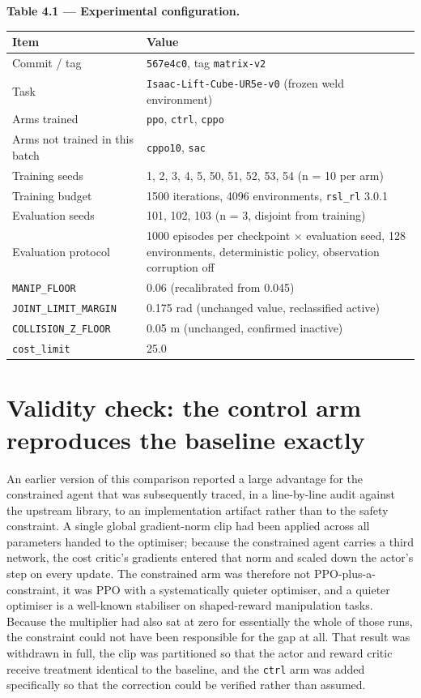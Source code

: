 \textbf{Table 4.1 --- Experimental configuration.}

\begin{longtable}[]{@{}ll@{}}
\toprule
Item & Value\tabularnewline
\midrule
\endhead
Commit / tag & \texttt{567e4c0}, tag \texttt{matrix-v2}\tabularnewline
Task & \texttt{Isaac-Lift-Cube-UR5e-v0} (frozen weld environment)\tabularnewline
Arms trained & \texttt{ppo}, \texttt{ctrl}, \texttt{cppo}\tabularnewline
Arms not trained in this batch & \texttt{cppo10}, \texttt{sac}\tabularnewline
Training seeds & 1, 2, 3, 4, 5, 50, 51, 52, 53, 54 (n = 10 per arm)\tabularnewline
Training budget & 1500 iterations, 4096 environments, \texttt{rsl\_rl} 3.0.1\tabularnewline
Evaluation seeds & 101, 102, 103 (n = 3, disjoint from training)\tabularnewline
Evaluation protocol & 1000 episodes per checkpoint \(\times\) evaluation seed, 128 environments, deterministic policy, observation corruption off\tabularnewline
\texttt{MANIP\_FLOOR} & 0.06 (recalibrated from 0.045)\tabularnewline
\texttt{JOINT\_LIMIT\_MARGIN} & 0.175 rad (unchanged value, reclassified active)\tabularnewline
\texttt{COLLISION\_Z\_FLOOR} & 0.05 m (unchanged, confirmed inactive)\tabularnewline
\texttt{cost\_limit} & 25.0\tabularnewline
\bottomrule
\end{longtable}


\section{Validity check: the control arm reproduces the baseline exactly}\label{sec:r-validity}

An earlier version of this comparison reported a large advantage for the constrained agent that
was subsequently traced, in a line-by-line audit against the upstream library, to an
implementation artifact rather than to the safety constraint. A single global gradient-norm clip
had been applied across all parameters handed to the optimiser; because the constrained agent
carries a third network, the cost critic's gradients entered that norm and scaled down the actor's
step on every update. The constrained arm was therefore not PPO-plus-a-constraint, it was PPO with
a systematically quieter optimiser, and a quieter optimiser is a well-known stabiliser on shaped-reward
manipulation tasks. Because the multiplier had also sat at zero for essentially the whole of those
runs, the constraint could not have been responsible for the gap at all. That result was withdrawn
in full, the clip was partitioned so that the actor and reward critic receive treatment identical
to the baseline, and the \texttt{ctrl} arm was added specifically so that the correction could be
verified rather than assumed.

